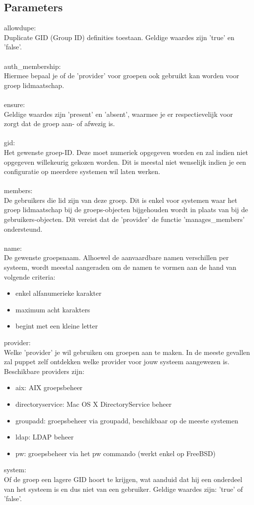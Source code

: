 \subsection{Parameters}
allowdupe:\\
Duplicate GID (Group ID) definities toestaan. Geldige waardes zijn 'true' en 'false'.\\\\
%
auth\_membership:\\
Hiermee bepaal je of de 'provider' voor groepen ook gebruikt kan worden voor groep lidmaatschap.\\\\
%
ensure:\\
Geldige waardes zijn 'present' en 'absent', waarmee je er respectievelijk voor zorgt dat de groep aan- of afwezig is.\\\\
%
gid:\\
Het gewenste groep-ID. Deze moet numeriek opgegeven worden en zal indien niet opgegeven willekeurig gekozen worden. Dit is meestal niet wenselijk indien je een configuratie op meerdere systemen wil laten werken.\\\\
%
members:\\
De gebruikers die lid zijn van deze groep. Dit is enkel voor systemen waar het groep lidmaatschap bij de groeps-objecten bijgehouden wordt in plaats van bij de gebruikers-objecten. Dit vereist dat de 'provider' de functie 'manages\_members' ondersteund.\\\\
%
name:\\
De gewenste groepsnaam. Alhoewel de aanvaardbare namen verschillen per systeem, wordt meestal aangeraden om de namen te vormen aan de hand van volgende criteria:
\begin{itemize}
\item enkel alfanumerieke karakter
\item maximum acht karakters
\item begint met een kleine letter
\end{itemize}
%
provider:\\
Welke 'provider' je wil gebruiken om groepen aan te maken. In de meeste gevallen zal puppet zelf ontdekken welke provider voor jouw systeem aangewezen is. Beschikbare providers zijn:
\begin{itemize}
\item aix: AIX groepsbeheer
\item directoryservice: Mac OS X DirectoryService beheer
\item groupadd: groepsbeheer via groupadd, beschikbaar op de meeste systemen
\item ldap: LDAP beheer
\item pw: groepsbeheer via het pw commando (werkt enkel op FreeBSD)
\end{itemize}
%
system:\\
Of de groep een lagere GID hoort te krijgen, wat aanduid dat hij een onderdeel van het systeem is en dus niet van een gebruiker. Geldige waardes zijn: 'true' of 'false'.

